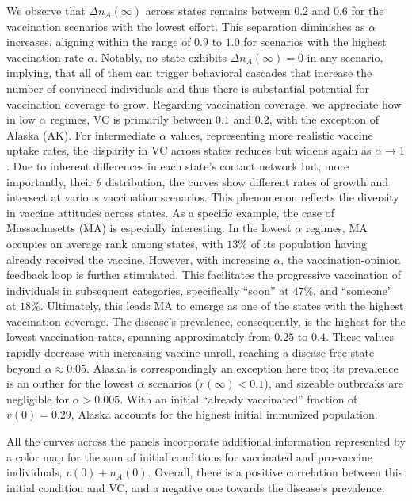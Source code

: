\documentclass[
 reprint,
 amsmath,amssymb,
 aps,
]{revtex4-2}
\begin{document}
We observe that $\Delta n_A(\infty)$ across states remains between $0.2$ and $0.6$ for the vaccination scenarios with the lowest effort. This separation diminishes as $\alpha$ increases, aligning within the range of $0.9$ to $1.0$ for scenarios with the highest vaccination rate $\alpha$. Notably, no state exhibits $\Delta n_A(\infty)=0$ in any scenario, implying, that all of them can trigger behavioral cascades that increase the number of convinced individuals and thus there is substantial potential for vaccination coverage to grow. Regarding vaccination coverage, we appreciate how in low $\alpha$ regimes, VC is primarily between $0.1$ and $0.2$, with the exception of Alaska (AK). For intermediate $\alpha$ values, representing more realistic vaccine uptake rates, the disparity in VC across states reduces but widens again as $\alpha\to 1$. Due to inherent differences in each state's contact network but, more importantly, their $\theta$ distribution, the curves show different rates of growth and intersect at various vaccination scenarios. This phenomenon reflects the diversity in vaccine attitudes across states. As a specific example, the case of Massachusetts (MA) is especially interesting. In the lowest $\alpha$ regimes, MA occupies an average rank among states, with $13\%$ of its population having already received the vaccine. However, with increasing $\alpha$, the vaccination-opinion feedback loop is further stimulated. This facilitates the progressive vaccination of individuals in subsequent categories, specifically ``soon'' at $47\%$, and ``someone'' at $18\%$. Ultimately, this leads MA to emerge as one of the states with the highest vaccination coverage. The disease's prevalence, consequently, is the highest for the lowest vaccination rates, spanning approximately from $0.25$ to $0.4$. These values rapidly decrease with increasing vaccine unroll, reaching a disease-free state beyond $\alpha\approx 0.05$. Alaska is correspondingly an exception here too; its prevalence is an outlier for the lowest $\alpha$ scenarios ($r(\infty)<0.1$), and sizeable outbreaks are negligible for $\alpha>0.005$. With an initial ``already vaccinated'' fraction of $v(0)=0.29$, Alaska accounts for the highest initial immunized population. 

All the curves across the panels incorporate additional information represented by a color map for the sum of initial conditions for vaccinated and pro-vaccine individuals, $v(0)+n_A(0)$. Overall, there is a positive correlation between this initial condition and VC, and a negative one towards the disease's prevalence.
\end{document}
